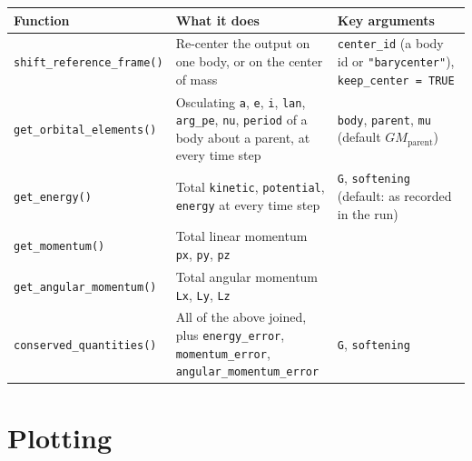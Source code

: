\documentclass[
  10.5pt,
  letterpaper,
]{scrbook}
\newcounter{none} %
\theoremstyle{definition}
\theoremstyle{plain}
\theoremstyle{remark}
\begin{document}
{\def\LTcaptype{none} %
\begin{longtable}[]{@{}
  >{\raggedright\arraybackslash}p{}
  >{\raggedright\arraybackslash}p{}
  >{\raggedright\arraybackslash}p{}@{}}
\toprule\noalign{}
\begin{minipage}[b]{\linewidth}\raggedright
Function
\end{minipage} & \begin{minipage}[b]{\linewidth}\raggedright
What it does
\end{minipage} & \begin{minipage}[b]{\linewidth}\raggedright
Key arguments
\end{minipage} \\
\midrule\noalign{}
\endhead
\bottomrule\noalign{}
\endlastfoot
\texttt{shift\_reference\_frame()} & Re-center the output on one body,
or on the center of mass & \texttt{center\_id} (a body id or
\texttt{"barycenter"}), \texttt{keep\_center\ =\ TRUE} \\
\texttt{get\_orbital\_elements()} & Osculating \texttt{a}, \texttt{e},
\texttt{i}, \texttt{lan}, \texttt{arg\_pe}, \texttt{nu}, \texttt{period}
of a body about a parent, at every time step & \texttt{body},
\texttt{parent}, \texttt{mu} (default \(GM_{\mathrm{parent}}\)) \\
\texttt{get\_energy()} & Total \texttt{kinetic}, \texttt{potential},
\texttt{energy} at every time step & \texttt{G}, \texttt{softening}
(default: as recorded in the run) \\
\texttt{get\_momentum()} & Total linear momentum \texttt{px},
\texttt{py}, \texttt{pz} & \\
\texttt{get\_angular\_momentum()} & Total angular momentum \texttt{Lx},
\texttt{Ly}, \texttt{Lz} & \\
\texttt{conserved\_quantities()} & All of the above joined, plus
\texttt{energy\_error}, \texttt{momentum\_error},
\texttt{angular\_momentum\_error} & \texttt{G}, \texttt{softening} \\
\end{longtable}
}

\section{Plotting}\label{plotting}
\end{document}
